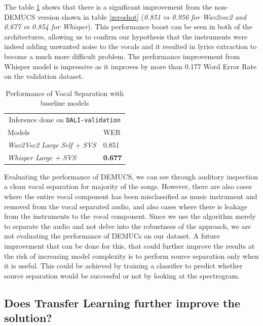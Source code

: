 The table \ref{demucsperformance}  shows that there is a significant improvement from the non-DEMUCS version shown in table \ref{zeroshot} (\textit{0.851 vs 0.956 for Wav2vec2 and 0.677 vs 0.854 for Whisper}). This performance boost can be seen in both of the architectures, allowing us to confirm our hypothesis that the instruments were indeed adding unwanted noise to the vocals and it resulted in lyrics extraction to become a much more difficult problem. The performance improvement from Whisper model is impressive as it improves by more than 0.177  Word Error Rate on the validation dataset. \\


\renewcommand{\arraystretch}{2}
\setlength{\arrayrulewidth}{0.3mm}
\begin{table}[H]
\small
\begin{center}
\begin{tabular}{ |p{7cm}| p{3cm}| }
\multicolumn{2}{c}{Inference done on \texttt{DALI-validation}} \\
\cline{1-2}
 Models     & WER  \\
\hline  \hline
 \textit{Wav2Vec2 Large Self + SVS}    & 0.851 \\
 \textit{Whisper Large + SVS}   & \textbf{0.677} \\
\hline  \hline
\end{tabular} 
\caption{\label{demucsperformance} Performance of Vocal Separation with baseline models}
\end{center}
\end{table}


Evaluating the performance of DEMUCS, we can see through auditory inspection a clean vocal separation for majority of the songs. However, there are also cases where the entire vocal component has been misclassified as music instrument and removed from the vocal separated audio, and also cases where there is leakage from the instruments to the vocal component. Since we use the algorithm merely to separate the audio and not delve into the robustness of the approach, we are not evaluating the performance of DEMUCs on our dataset. A future improvement that can be done for this, that could further improve the results at the risk of increasing model complexity is to perform source separation only when it is useful. This could be achieved by training a classifier to predict whether source separation would be successful or not by looking at the spectrogram. 

    
\subsection{Does Transfer Learning further improve the solution?}


